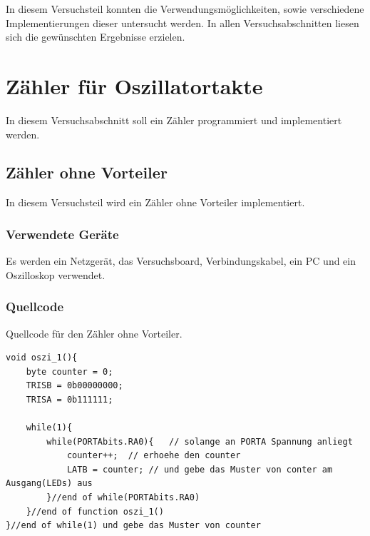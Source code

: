\documentclass[12pt,a4paper]{article}
\begin{document}
In diesem Versuchsteil konnten die Verwendungsmöglichkeiten, sowie verschiedene Implementierungen dieser untersucht werden. In allen Versuchsabschnitten liesen sich die gewünschten Ergebnisse erzielen.

\section{Zähler für Oszillatortakte}

In diesem Versuchsabschnitt soll ein Zähler programmiert und implementiert werden.

\subsection{Zähler ohne Vorteiler}

In diesem Versuchsteil wird ein Zähler ohne Vorteiler implementiert.

\subsubsection*{Verwendete Geräte}

Es werden ein Netzgerät, das Versuchsboard, Verbindungskabel, ein PC und ein Oszilloskop verwendet.

\subsubsection*{Quellcode}

Quellcode für den Zähler ohne Vorteiler.

\lstset{language=C, basicstyle=\tiny}
\begin{lstlisting}[caption = {Zähler ohne Vorteiler}, label=lst:g_11,captionpos=b]
void oszi_1(){
	byte counter = 0;
	TRISB = 0b00000000;
	TRISA = 0b111111;
	
	while(1){
		while(PORTAbits.RA0){	// solange an PORTA Spannung anliegt
			counter++;	// erhoehe den counter
			LATB = counter;	// und gebe das Muster von conter am Ausgang(LEDs) aus
		}//end of while(PORTAbits.RA0)
	}//end of function oszi_1()
}//end of while(1) und gebe das Muster von counter
\end{lstlisting}
\end{document}
